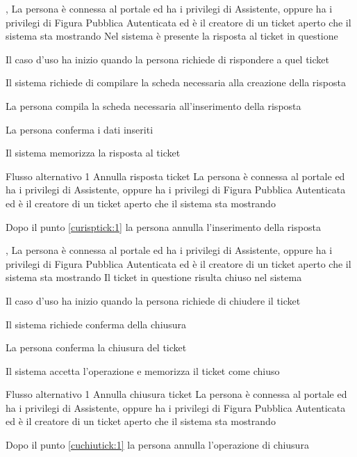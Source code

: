 
{, }
{La persona è connessa al portale ed ha i privilegi di Assistente, oppure ha i privilegi di Figura Pubblica Autenticata ed è il creatore di un ticket aperto che il sistema sta mostrando}
{Nel sistema è presente la risposta al ticket in questione}
{\begin{enumCU}
	\item Il caso d'uso ha inizio quando la persona richiede di rispondere a quel ticket
	\item Il sistema richiede di compilare la scheda necessaria alla creazione della risposta
	\item La persona compila la scheda necessaria all'inserimento della risposta\label{curisptick:1}
	\item La persona conferma i dati inseriti
	\item Il sistema memorizza la risposta al ticket
\end{enumCU}}
%
{Flusso alternativo 1}%
{Annulla risposta ticket}%
{La persona è connessa al portale ed ha i privilegi di Assistente, oppure ha i privilegi di Figura Pubblica Autenticata ed è il creatore di un ticket aperto che il sistema sta mostrando}%
{\postNulle}%
{\begin{enumCU}
		\item Dopo il punto \ref{curisptick:1} la persona annulla l'inserimento della risposta
	\end{enumCU}}%


{, }
{La persona è connessa al portale ed ha i privilegi di Assistente, oppure ha i privilegi di Figura Pubblica Autenticata ed è il creatore di un ticket aperto che il sistema sta mostrando}
{Il ticket in questione risulta chiuso nel sistema}
{\begin{enumCU}
	\item Il caso d'uso ha inizio quando la persona richiede di chiudere il ticket\label{cuchiutick:0}
	\item Il sistema richiede conferma della chiusura\label{cuchiutick:1}
	\item La persona conferma la chiusura del ticket
	\item Il sistema accetta l'operazione e memorizza il ticket come chiuso
\end{enumCU}}
%
{Flusso alternativo 1}%
{Annulla chiusura ticket}%
{La persona è connessa al portale ed ha i privilegi di Assistente, oppure ha i privilegi di Figura Pubblica Autenticata ed è il creatore di un ticket aperto che il sistema sta mostrando}%
{\postNulle}%
{\begin{enumCU}
		\item Dopo il punto \ref{cuchiutick:1} la persona annulla l'operazione di chiusura
	\end{enumCU}}%


